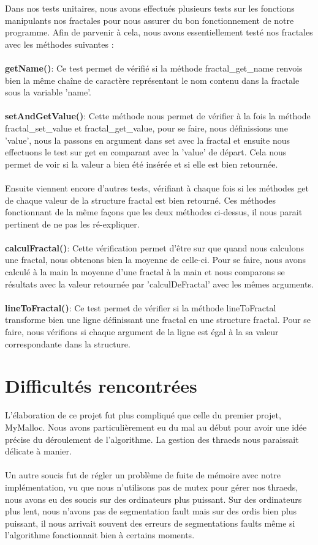 \documentclass[11pt]{article}
\begin{document}
Dans nos tests unitaires, nous avons effectués plusieurs tests sur les fonctions manipulants nos fractales pour nous assurer du bon fonctionnement de notre programme. Afin de parvenir à cela, nous avons essentiellement testé nos fractales avec les méthodes suivantes :
\\
\\
\textbf{getName()}: Ce test permet de vérifié si la méthode fractal\_get\_name renvois bien la même chaîne de caractère représentant le nom contenu dans la fractale sous la variable 'name'.
\\
\\
\textbf{setAndGetValue()}: Cette méthode nous permet de vérifier à la fois la méthode fractal\_set\_value et fractal\_get\_value, 
pour se faire, nous définissions une 'value', nous la passons en argument dans set avec la fractal et ensuite nous effectuons le test sur get en comparant avec la 'value' de départ. Cela nous permet de voir si la valeur a bien été insérée et si elle est bien retournée.
\\
\\
Ensuite viennent encore d'autres tests, vérifiant à chaque fois si les méthodes get de chaque valeur de la structure fractal est bien retourné. Ces méthodes fonctionnant de la même façons que les deux méthodes ci-dessus, il nous parait pertinent de ne pas les ré-expliquer.
\\
\\
\textbf{calculFractal()}: Cette vérification permet d'être sur que quand nous calculons une fractal, nous obtenons bien la moyenne de celle-ci. Pour se faire, nous avons calculé à la main la moyenne d'une fractal à la main et nous comparons se résultats avec la valeur retournée par 'calculDeFractal' avec les mêmes arguments.
\\
\\
\textbf{lineToFractal()}: Ce test permet de vérifier si la méthode lineToFractal transforme bien une ligne définissant une fractal en une structure fractal. Pour se faire, nous vérifions si chaque argument de la ligne est égal à la sa valeur correspondante dans la structure.

\section{Difficultés rencontrées}
L'élaboration de ce projet fut plus compliqué que celle du premier projet, MyMalloc. Nous avons particulièrement eu du mal au début pour avoir une idée précise du déroulement de l'algorithme. La gestion des thraeds nous paraissait délicate à manier. 
\\
\\
Un autre soucis fut de régler un problème de fuite de mémoire avec notre implémentation, vu que nous n'utilisons pas de mutex pour gérer nos thraeds, nous avons eu des soucis sur des ordinateurs plus puissant. Sur des ordinateurs plus lent, nous n'avons pas de segmentation fault mais sur des ordis bien plus puissant, il nous arrivait souvent des erreurs de segmentations faults même si l'algorithme fonctionnait bien à certains moments.
\end{document}
